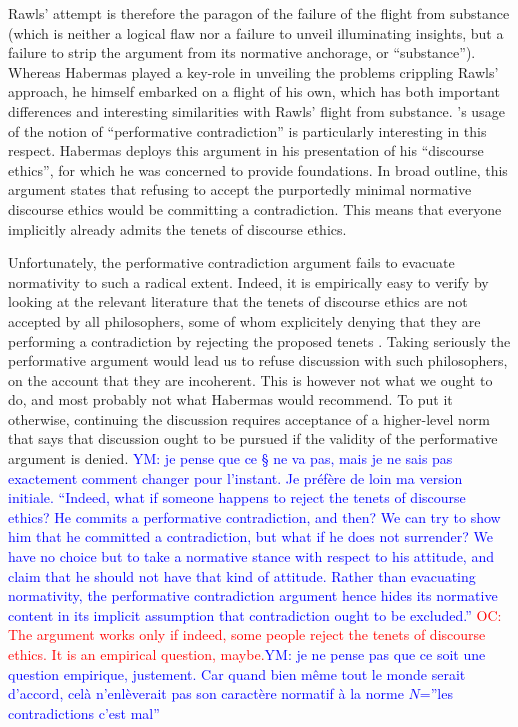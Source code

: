 \documentclass[preprint, french, english, 11pt, authoryear]{elsarticle}%
\newcommand{\commentYM}[1]{\textcolor{blue}{YM: #1}}
\newcommand{\commentOC}[1]{\textcolor{red}{OC: #1}}
\begin{document}
Rawls' attempt is therefore the paragon of the failure of the flight from substance (which is neither a logical flaw nor a failure to unveil illuminating insights, but a failure to strip the argument from its normative anchorage, or ``substance''). Whereas Habermas played a key-role in unveiling the problems crippling Rawls' approach, he himself embarked on a flight of his own, which has both important differences and interesting similarities with Rawls' flight from substance. \cite{habermas_moralbewustsein_1983}'s usage of the notion of ``performative contradiction'' is particularly interesting in this respect. Habermas deploys this argument in his presentation of his ``discourse ethics'', for which he was concerned to provide foundations. In broad outline, this argument states that refusing to accept the purportedly minimal normative discourse ethics would be committing a contradiction. This means that everyone implicitly already admits the tenets of discourse ethics.

Unfortunately, the performative contradiction argument fails to evacuate normativity to such a radical extent. Indeed, it is empirically easy to verify by looking at the relevant literature that the tenets of discourse ethics are not accepted by all philosophers, some of whom explicitely denying that they are performing a contradiction by rejecting the proposed tenets \citep{heath_communicative_2001}. Taking seriously the performative argument would lead us to refuse discussion with such philosophers, on the account that they are incoherent. This is however not what we ought to do, and most probably not what Habermas would recommend. To put it otherwise, continuing the discussion requires acceptance of a higher-level norm that says that discussion ought to be pursued if the validity of the performative argument is denied. \commentYM{je pense que ce § ne va pas, mais je ne sais pas exactement comment changer pour l'instant. Je préfère de loin ma version initiale. ``Indeed, what if someone happens to reject the tenets of discourse ethics? He commits a performative contradiction, and then? We can try to show him that he committed a contradiction, but what if he does not surrender? We have no choice but to take a normative stance with respect to his attitude, and claim that he should not have that kind of attitude. Rather than evacuating normativity, the performative contradiction argument hence hides its normative content in its implicit assumption that contradiction ought to be excluded.''}
\commentOC{The argument works only if indeed, some people reject the tenets of discourse ethics. It is an empirical question, maybe.}\commentYM{je ne pense pas que ce soit une question empirique, justement. Car quand bien même tout le monde serait d'accord, celà n'enlèverait pas son caractère normatif à la norme $N$=''les contradictions c'est mal''}
\end{document}
